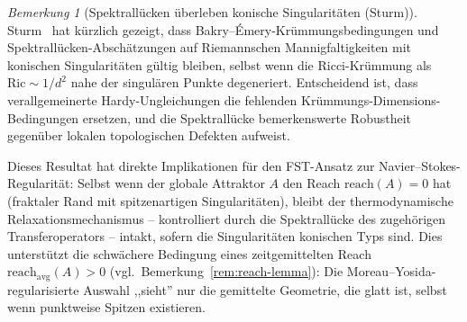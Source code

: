 \documentclass[12pt,a4paper]{article}
\theoremstyle{definition}
\theoremstyle{plain}
\theoremstyle{remark}
\newtheorem{remark}[definition]{Bemerkung}
\begin{document}
\begin{remark}[Spektrallücken überleben konische Singularitäten (Sturm)]
\label{rem:sturm-conical}
Sturm~\cite{Sturm2025} hat kürzlich gezeigt, dass Bakry--\'Emery-Krümmungsbedingungen und Spektrallücken-Abschätzungen auf Riemannschen Mannigfaltigkeiten mit konischen Singularitäten gültig bleiben, selbst wenn die Ricci-Krümmung als $\mathrm{Ric} \sim 1/d^2$ nahe der singulären Punkte degeneriert. Entscheidend ist, dass verallgemeinerte Hardy-Ungleichungen die fehlenden Krümmungs-Dimensions-Bedingungen ersetzen, und die Spektrallücke bemerkenswerte Robustheit gegenüber lokalen topologischen Defekten aufweist.

Dieses Resultat hat direkte Implikationen für den FST-Ansatz zur Navier--Stokes-Regularität: Selbst wenn der globale Attraktor $A$ den Reach $\mathrm{reach}(A) = 0$ hat (fraktaler Rand mit spitzenartigen Singularitäten), bleibt der thermodynamische Relaxationsmechanismus -- kontrolliert durch die Spektrallücke des zugehörigen Transferoperators -- intakt, sofern die Singularitäten konischen Typs sind. Dies unterstützt die schwächere Bedingung eines zeitgemittelten Reach $\mathrm{reach}_{\mathrm{avg}}(A) > 0$ (vgl.\ Bemerkung~\ref{rem:reach-lemma}): Die Moreau--Yosida-regularisierte Auswahl ,,sieht'' nur die gemittelte Geometrie, die glatt ist, selbst wenn punktweise Spitzen existieren.
\end{remark}
\end{document}
